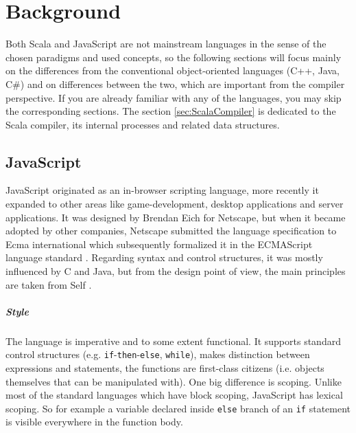 \documentclass[12pt,a4paper]{report}
\begin{document}
\chapter{Background}

Both Scala and JavaScript are not mainstream languages in the sense of the chosen paradigms and used concepts, so the following sections will focus mainly on the differences from the conventional object-oriented languages (C++, Java, C\#) and on differences between the two, which are important from the compiler perspective. If you are already familiar with any of the languages, you may skip the corresponding sections. The section \ref{sec:ScalaCompiler} is dedicated to the Scala compiler, its internal processes and related data structures.

\section{JavaScript}

JavaScript \cite{JavaScript} originated as an in-browser scripting language, more recently it expanded to other areas like game-development, desktop applications and server applications. It was designed by Brendan Eich for Netscape, but when it became adopted by other companies, Netscape submitted the language specification to Ecma international which subsequently formalized it in the ECMAScript language standard \cite{EcmaScript}. Regarding syntax and control structures, it was mostly influenced by C and Java, but from the design point of view, the main principles are taken from Self \cite{Self}.

\paragraph{Style} The language is imperative and to some extent functional. It supports standard control structures (e.g. \texttt{if}-\texttt{then}-\texttt{else}, \texttt{while}), makes distinction between expressions and statements, the functions are first-class citizens (i.e. objects themselves that can be manipulated with). One big difference is scoping. Unlike most of the standard languages which have block scoping, JavaScript has lexical scoping. So for example a variable declared inside \texttt{else} branch of an \texttt{if} statement is visible everywhere in the function body.
\end{document}

